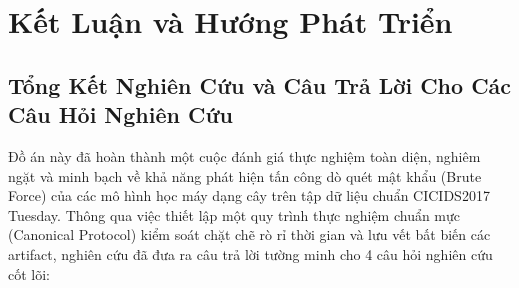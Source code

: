 
\chapter{Kết Luận và Hướng Phát Triển}
\label{chap:ket_luan}

\section{Tổng Kết Nghiên Cứu và Câu Trả Lời Cho Các Câu Hỏi Nghiên Cứu}

Đồ án này đã hoàn thành một cuộc đánh giá thực nghiệm toàn diện, nghiêm ngặt và minh bạch về khả năng phát hiện tấn công dò quét mật khẩu (Brute Force) của các mô hình học máy dạng cây trên tập dữ liệu chuẩn CICIDS2017 Tuesday. Thông qua việc thiết lập một quy trình thực nghiệm chuẩn mực (Canonical Protocol) kiểm soát chặt chẽ rò rỉ thời gian và lưu vết bất biến các artifact, nghiên cứu đã đưa ra câu trả lời tường minh cho 4 câu hỏi nghiên cứu cốt lõi:

